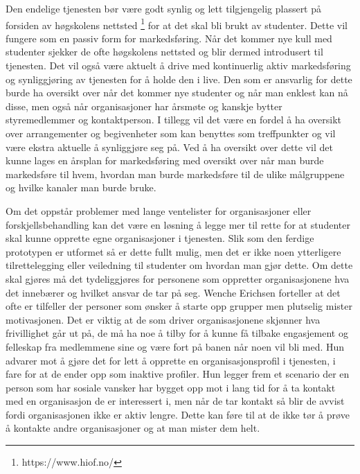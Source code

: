 Den endelige tjenesten bør være godt synlig og lett tilgjengelig plassert på forsiden av høgskolens nettsted \footnote{https://www.hiof.no/} for at det skal bli brukt av studenter. Dette vil fungere som en passiv form for markedsføring. Når det kommer nye kull med studenter sjekker de ofte høgskolens nettsted og blir dermed introdusert til tjenesten. Det vil også være aktuelt å drive med kontinuerlig aktiv markedsføring og synliggjøring av tjenesten for å holde den i live. Den som er ansvarlig for dette burde ha oversikt over når det kommer nye studenter og når man enklest kan nå disse, men også når organisasjoner har årsmøte og kanskje bytter styremedlemmer og kontaktperson. I tillegg vil det være en fordel å ha oversikt over arrangementer og begivenheter som kan benyttes som treffpunkter og vil være ekstra aktuelle å synliggjøre seg på. Ved å ha oversikt over dette vil det kunne lages en årsplan for markedsføring med oversikt over når man burde markedsføre til hvem, hvordan man burde markedsføre til de ulike målgruppene og hvilke kanaler man burde bruke.

Om det oppstår problemer med lange ventelister for organisasjoner eller forskjellsbehandling kan det være en løsning å legge mer til rette for at studenter skal kunne opprette egne organisasjoner i tjenesten. Slik som den ferdige prototypen er utformet så er dette fullt mulig, men det er ikke noen ytterligere tilrettelegging eller veiledning til studenter om hvordan man gjør dette. Om dette skal gjøres må det tydeliggjøres for personene som oppretter organisasjonene hva det innebærer og hvilket ansvar de tar på seg. 
Wenche Erichsen forteller at det ofte er tilfeller der personer som ønsker å starte opp grupper men plutselig mister motivasjonen. Det er viktig at de som driver organisasjonene skjønner hva frivillighet går ut på, de må ha noe å tilby for å kunne få tilbake engasjement og felleskap fra medlemmene sine og være fort på banen når noen vil bli med. Hun advarer mot å gjøre det for lett å opprette en organisasjonsprofil i tjenesten, i fare for at de ender opp som inaktive profiler. Hun legger frem et scenario der en person som har sosiale vansker har bygget opp mot i lang tid for å ta kontakt med en organisasjon de er interessert i, men når de tar kontakt så blir de avvist fordi organisasjonen ikke er aktiv lengre. Dette kan føre til at de ikke tør å prøve å kontakte andre organisasjoner og at man mister dem helt. \cite{FRIVILLIGSENTRALEN-INTERVJU:21}



